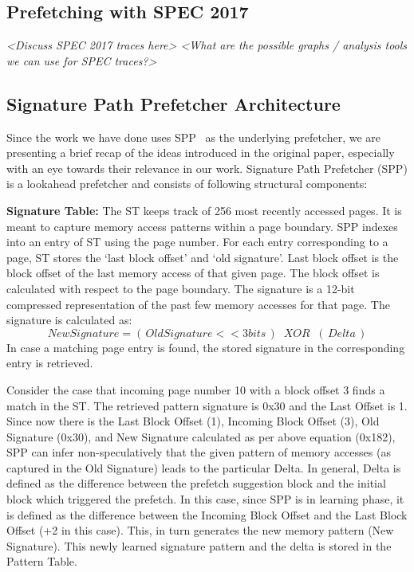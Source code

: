  
\subsection{Prefetching with SPEC 2017}
\label{Background-SPEC2017}
\textit{<Discuss SPEC 2017 traces here>
<What are the possible graphs / analysis tools we can use for SPEC traces?>}

\subsection{Signature Path Prefetcher Architecture}
\label{Background-SPP}
Since the work we have done uses SPP~\cite{SPP} as the underlying prefetcher, we are
presenting a brief recap of the ideas introduced in the original
paper, especially with an eye towards their relevance in our work.
Signature Path Prefetcher (SPP) is a lookahead prefetcher and consists
of following structural components:

\textbf{Signature Table:} The ST keeps track of 256 most recently accessed
pages.  It is meant to capture memory access patterns within a page
boundary.  SPP indexes into an entry of ST using the page number.  For
each entry corresponding to a page, ST stores the `last block offset'
and `old signature'.  Last block offset is the block offset of the
last memory access of that given page.  The block offset is calculated
with respect to the page boundary.  The signature is a 12-bit
compressed representation of the past few memory accesses for that
page.  The signature is calculated as:
$$New Signature = (\,Old Signature << 3 bits\,) \;\;XOR\;\; (\,Delta\,)$$ 
In case a matching page entry is found, the stored signature in the corresponding entry is retrieved.

Consider the case that incoming page number 10 with a block offset 3
finds a match in the ST.  The retrieved pattern signature is 0x30 and
the Last Offset is 1.  Since now there is the Last Block Offset (1),
Incoming Block Offset (3), Old Signature (0x30), and New Signature
calculated as per above equation (0x182), SPP can infer
non-speculatively that the given pattern of memory accesses (as
captured in the Old Signature) leads to the particular Delta.  In
general, Delta is defined as the difference between the prefetch
suggestion block and the initial block which triggered the prefetch.
In this case, since SPP is in learning phase, it is defined as the
difference between the Incoming Block Offset and the Last Block Offset
(+2 in this case).  This, in turn generates the new memory pattern
(New Signature).  This newly learned signature pattern and the delta
is stored in the Pattern Table.

